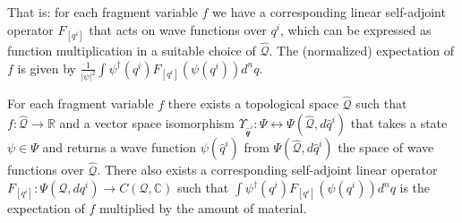 \documentclass[smallextended]{svjour3}
\numberwithin{equation}{section}
\begin{document}
That is: for each fragment variable $f$ we have a corresponding linear self-adjoint operator $F_{[q^i]}$ that acts on wave functions over $q^i$, which can be expressed as function multiplication in a suitable choice of $\hat{\mathcal{Q}}$. The (normalized) expectation of $f$ is given by $\frac{1}{|\psi|^2}\int \psi^\dagger(q^i) F_{[q^i]} (\psi(q^i)) d^nq$.

\begin{prop}\label{prop:self_adjoint_operators}
	For each fragment variable $f$ there exists a topological space $\hat{\mathcal{Q}}$ such that $f : \hat{\mathcal{Q}} \rightarrow \mathbb{R}$ and a vector space isomorphism $\Upsilon_{\hat{\mathcal{q}}^i} : \Psi \leftrightarrow \Psi(\hat{\mathcal{Q}}, d\hat{q}^i)$ that takes a state $\psi \in \Psi$ and returns a wave function $\psi(\hat{q}^i)$ from $\Psi(\hat{\mathcal{Q}}, d\hat{q}^i)$ the space of wave functions over $\hat{\mathcal{Q}}$. There also exists a corresponding self-adjoint linear operator $F_{[q^i]} : \Psi(\mathcal{Q}, dq^i) \rightarrow C(\mathcal{Q}, \mathbb{C})$ such that $\int \psi^\dagger(q^i) F_{[q^i]}( \psi(q^i))d^nq $ is the expectation of $f$ multiplied by the amount of material. 
\end{prop}
\end{document}
